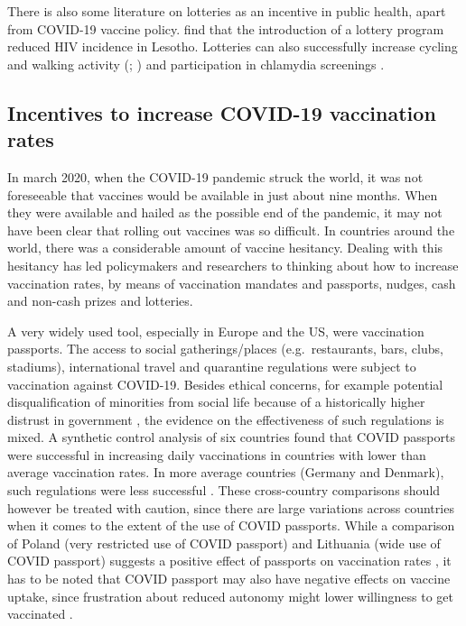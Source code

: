 \documentclass{scrbook}
\begin{document}
There is also some literature on lotteries as an incentive in public
health, apart from COVID-19 vaccine policy.
\textcite{bjorkman_nyqvist_incentivizing_2018} find that the
introduction of a lottery program reduced HIV incidence in Lesotho.
Lotteries can also successfully increase cycling and walking activity
(\cite{ciccone_using_2021}; \cite{patel_randomized_2018}) and
participation in chlamydia screenings \parencite{niza_vouchers_2014}.

\subsection{Incentives to increase COVID-19 vaccination rates}

In march 2020, when the COVID-19 pandemic struck the world, it was not
foreseeable that vaccines would be available in just about nine months.
When they were available and hailed as the possible end of the pandemic,
it may not have been clear that rolling out vaccines was so difficult.
In countries around the world, there was a considerable amount of
vaccine hesitancy. Dealing with this hesitancy has led policymakers and
researchers to thinking about how to increase vaccination rates, by
means of vaccination mandates and passports, nudges, cash and non-cash
prizes and lotteries.

A very widely used tool, especially in Europe and the US, were
vaccination passports. The access to social gatherings/places
(e.g.~restaurants, bars, clubs, stadiums), international travel and
quarantine regulations were subject to vaccination against COVID-19.
Besides ethical concerns, for example potential disqualification of
minorities from social life because of a historically higher distrust in
government \parencite{gostin_digital_2021}, the evidence on the
effectiveness of such regulations is mixed. A synthetic control analysis
of six countries found that COVID passports were successful in
increasing daily vaccinations in countries with lower than average
vaccination rates. In more average countries (Germany and Denmark), such
regulations were less successful \parencite{mills_effect_2022}. These
cross-country comparisons should however be treated with caution, since
there are large variations across countries when it comes to the extent
of the use of COVID passports. While a comparison of Poland (very
restricted use of COVID passport) and Lithuania (wide use of COVID
passport) suggests a positive effect of passports on vaccination rates
\parencite{walkowiak_covid-19_2021}, it has to be noted that COVID
passport may also have negative effects on vaccine uptake, since
frustration about reduced autonomy might lower willingness to get
vaccinated \parencite{porat_vaccine_2021}.
\end{document}
